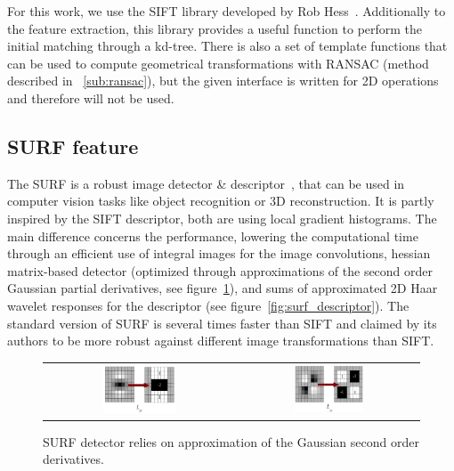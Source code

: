 For this work, we use the \gls{SIFT} library developed by Rob Hess~\cite{hess_sift}. Additionally to the feature extraction, this library provides a useful function to perform the initial matching through a kd-tree. There is also a set of template functions that can be used to compute geometrical transformations with \gls{RANSAC} (method described in ~\ref{sub:ransac}), but the given interface is written for 2D operations and therefore will not be used.

\subsection{SURF feature}

The \gls{SURF} is a robust image detector \& descriptor~\cite{surf}, that can be used in computer vision tasks like object recognition or 3D reconstruction. It is partly inspired by the \gls{SIFT} descriptor, both are using local gradient histograms. The main difference concerns the performance, lowering the computational time through an efficient use of integral images for the image convolutions, hessian matrix-based detector (optimized through approximations of the second order Gaussian partial derivatives, see figure~\ref{fig:surf_detector}), and sums of approximated 2D Haar wavelet responses for the descriptor (see figure~\ref{fig:surf_descriptor}). The standard version of \gls{SURF} is several times faster than \gls{SIFT} and claimed by its authors to be more robust against different image transformations than \gls{SIFT}.

\begin{figure}[H]
\centering
 \begin{tabular}{cc}
 \includegraphics[width=0.4\textwidth]{figures/surf_lyy} &
 \includegraphics[width=0.4\textwidth]{figures/surf_lxy}
 \end{tabular}
\caption{SURF detector relies on approximation of the Gaussian second order derivatives.}
\label{fig:surf_detector}
\end{figure}

